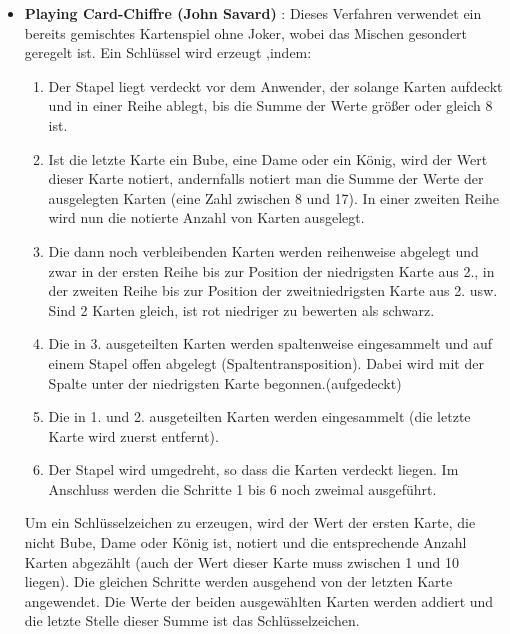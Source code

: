 \begin{refsegment}
\begin{itemize}
\begin{itemize}
      \item \textbf{Playing Card-Chiffre (John Savard)} \cite{Savard1999}:
         Dieses Verfahren verwendet ein bereits gemischtes Kartenspiel ohne
         Joker, wobei das Mischen gesondert geregelt ist. Ein Schlüssel wird
         erzeugt ,indem:
         \begin{enumerate}
            \item Der Stapel liegt verdeckt vor dem Anwender, der solange
               Karten aufdeckt und in einer Reihe ablegt, bis die Summe der
               Werte größer oder gleich 8 ist.
            \item Ist die letzte Karte ein Bube, eine Dame oder ein König,
               wird der Wert dieser Karte notiert, andernfalls notiert man die
               Summe der Werte der ausgelegten Karten (eine Zahl zwischen 8 und
               17). In einer zweiten Reihe wird nun die notierte Anzahl von
               Karten ausgelegt.
            \item Die dann noch verbleibenden Karten werden reihenweise
               abgelegt und zwar in der ersten Reihe bis zur Position der
               niedrigsten Karte aus 2., in der zweiten Reihe bis zur Position
               der zweitniedrigsten Karte aus 2. usw. Sind 2 Karten gleich,
               ist rot niedriger zu bewerten als schwarz.
            \item Die in 3. ausgeteilten Karten werden spaltenweise
               eingesammelt und auf einem Stapel offen abgelegt
               (Spaltentransposition).
               Dabei wird mit der Spalte unter der niedrigsten Karte
	       begonnen.(aufgedeckt)
            \item Die in 1. und 2. ausgeteilten Karten werden eingesammelt
               (die letzte Karte wird zuerst entfernt).
            \item Der Stapel wird umgedreht, so dass die Karten verdeckt
               liegen. Im Anschluss werden die Schritte 1 bis 6 noch zweimal
               ausgeführt.
         \end{enumerate}
         Um ein Schlüsselzeichen zu erzeugen, wird der Wert der ersten Karte,
         die nicht Bube, Dame oder König ist, notiert und die entsprechende
         Anzahl Karten abgezählt (auch der Wert dieser Karte muss zwischen 1
         und 10	liegen). Die gleichen Schritte werden ausgehend von der letzten
         Karte angewendet. Die Werte der beiden ausgewählten Karten werden
         addiert und die letzte Stelle dieser Summe ist das Schlüsselzeichen.\\
   \end{itemize}


\end{itemize}
\end{refsegment}
